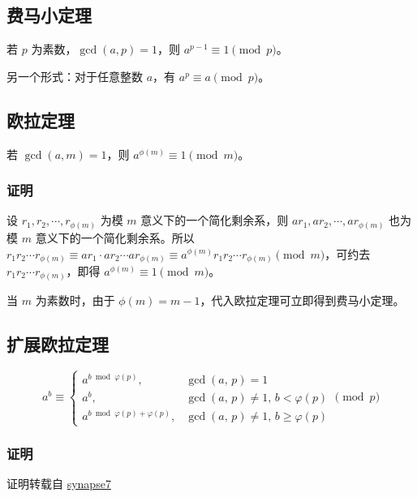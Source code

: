 
\subsection{费马小定理}

若 $p$ 为素数，$\gcd(a, p) = 1$，则 $a^{p - 1} \equiv 1 \pmod{p}$。

另一个形式：对于任意整数 $a$，有 $a^p \equiv a \pmod{p}$。

\subsection{欧拉定理}

若 $\gcd(a, m) = 1$，则 $a^{\phi(m)} \equiv 1 \pmod{m}$。

\subsubsection{证明}

设 $r_1, r_2, \cdots, r_{\phi(m)}$ 为模 $m$ 意义下的一个简化剩余系，则 $ar_1, ar_2, \cdots, ar_{\phi(m)}$ 也为模 $m$ 意义下的一个简化剩余系。所以 $r_1r_2 \cdots r_{\phi(m)} \equiv ar_1 \cdot ar_2 \cdots ar_{\phi(m)} \equiv a^{\phi(m)}r_1r_2 \cdots r_{\phi(m)} \pmod{m}$，可约去 $r_1r_2 \cdots r_{\phi(m)}$，即得 $a^{\phi(m)} \equiv 1 \pmod{m}$。

当 $m$ 为素数时，由于 $\phi(m) = m - 1$，代入欧拉定理可立即得到费马小定理。

\subsection{扩展欧拉定理}

$$
a^b\equiv
\begin{cases}
a^{b\bmod\varphi(p)},\,&\gcd(a,\,p)=1\\
a^b,&\gcd(a,\,p)\ne1,\,b<\varphi(p)\\
a^{b\bmod\varphi(p)+\varphi(p)},&\gcd(a,\,p)\ne1,\,b\ge\varphi(p)
\end{cases}
\pmod p
$$

\subsubsection{证明}

证明转载自 \href{http://blog.csdn.net/synapse7/article/details/19610361}{synapse7}

